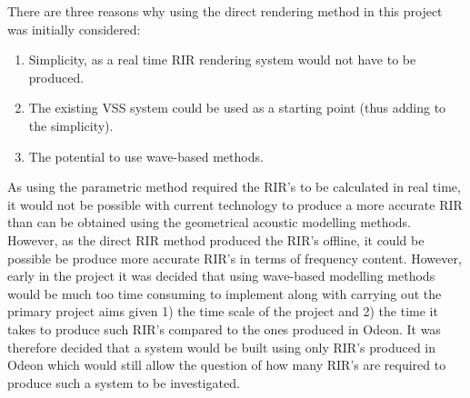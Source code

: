 \documentclass[../../main.tex]{subfiles}
\begin{document}
		There are three reasons why using the direct rendering method in this project was initially considered: 
		\begin{enumerate}
			\item Simplicity, as a real time \ac{RIR} rendering system would not have to be produced.
			\item The existing \ac{VSS} system could be used as a starting point (thus adding to the simplicity).
			\item The potential to use wave-based methods.
		\end{enumerate}

		As using the parametric method required the \ac{RIR}'s to be calculated in real time, it would not be possible with current technology to produce a more accurate \ac{RIR} than can be obtained using the geometrical acoustic modelling methods. However, as the direct \ac{RIR} method produced the \ac{RIR}'s offline, it could be possible be produce more accurate \ac{RIR}'s in terms of frequency content. However, early in the project it was decided that using wave-based modelling methods would be much too time consuming to implement along with carrying out the primary project aims given 1) the time scale of the project and 2) the time it takes to produce such \ac{RIR}'s compared to the ones produced in Odeon. It was therefore decided that a system would be built using only \ac{RIR}'s produced in Odeon which would still allow the question of how many \ac{RIR}'s are required to produce such a system to be investigated.



	
\end{document}
